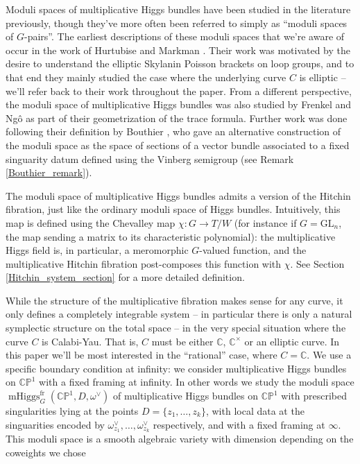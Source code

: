 \documentclass[11pt, oneside, reqno]{amsart}
\theoremstyle{definition} \newtheorem{definition}{Definition}[section]
\theoremstyle{definition} \newtheorem{remark}[definition]{Remark}
\theoremstyle{definition} \newtheorem{remarks}[definition]{Remarks}
\theoremstyle{definition} \newtheorem{question}[definition]{Question}
\theoremstyle{definition} \newtheorem*{note}{Note}
\theoremstyle{definition} \newtheorem{example}[definition]{Example}
\theoremstyle{definition} \newtheorem{examples}[definition]{Examples}
\newcommand{\bb}[1]{\mathbb{#1}}
\newcommand{\CC}{\mathbb{C}}
\newcommand{\GL}{\mathrm{GL}}
\DeclareMathOperator{\mhiggs}{mHiggs}
\begin{document}
 Moduli spaces of multiplicative Higgs bundles have been studied in the literature previously, though they've more often been referred to simply as ``moduli spaces of $G$-pairs''.  The earliest descriptions of these moduli spaces that we're aware of occur in the work of Hurtubise and Markman \cite{HurtubiseMarkman, HurtubiseMarkman1}.  Their work was motivated by the desire to understand the elliptic Skylanin Poisson brackets on loop groups, and to that end they mainly studied the case where the underlying curve $C$ is elliptic -- we'll refer back to their work throughout the paper.  From a different perspective, the moduli space of multiplicative Higgs bundles was also studied by Frenkel and Ng\^o \cite[Section 4]{FrenkelNgo} as part of their geometrization of the trace formula.  Further work was done following their definition by Bouthier \cite{Bouthier2, Bouthier1}, who gave an alternative construction of the moduli space as the space of sections of a vector bundle associated to a fixed singuarity datum defined using the Vinberg semigroup (see Remark \ref{Bouthier_remark}).  
 
 The moduli space of multiplicative Higgs bundles admits a version of the Hitchin fibration, just like the ordinary moduli space of Higgs bundles.  Intuitively, this map is defined using the Chevalley map $\chi \colon G \to T/W$ (for instance if $G = \GL_n$, the map sending a matrix to its characteristic polynomial): the multiplicative Higgs field is, in particular, a meromorphic $G$-valued function, and the multiplicative Hitchin fibration post-composes this function with $\chi$.  See Section \ref{Hitchin_system_section} for a more detailed definition.
 
 While the structure of the multiplicative fibration makes sense for any curve, it only defines a completely integrable system -- in particular there is only a natural symplectic structure on the total space -- in the very special situation where the curve $C$ is Calabi-Yau.  That is, $C$ must be either $\CC$, $\CC^\times$ or an elliptic curve.  In this paper we'll be most interested in the ``rational'' case, where $C = \CC$.  We use a specific boundary condition at infinity: we consider multiplicative Higgs bundles on $\bb{CP}^1$ with a fixed framing at infinity.  In other words we study the moduli space $\mhiggs^{\text{fr}}_G(\bb{CP}^1,D,\omega^\vee)$ of multiplicative Higgs bundles on $\bb{CP}^1$ with prescribed singularities lying at the points $D = \{z_1, \ldots, z_k\}$, with local data at the singuarities encoded by $\omega_{z_1}^\vee, \ldots, \omega_{z_k}^\vee$ respectively, and with a fixed framing at $\infty$.  This moduli space is a smooth algebraic variety with dimension depending on the coweights we chose
 
\end{document}
